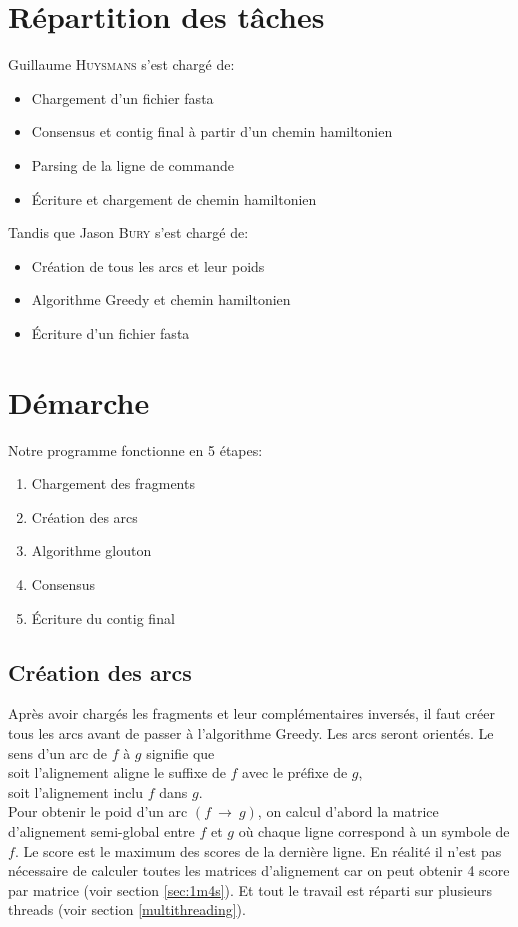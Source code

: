 \documentclass[a4paper, 12pt, titlepage]{article}
\newcommand{\arc}[2]{$(#1~\rightarrow~#2)$}
\begin{document}



\section{Répartition des tâches}
\noindent Guillaume \textsc{Huysmans} s'est chargé de:
\begin{itemize}
 \item Chargement d'un fichier fasta
 \item Consensus et contig final à partir d'un chemin hamiltonien
 \item Parsing de la ligne de commande
 \item Écriture et chargement de chemin hamiltonien
\end{itemize}
\noindent Tandis que Jason \textsc{Bury} s'est chargé de:
\begin{itemize}
 \item Création de tous les arcs et leur poids
 \item Algorithme Greedy et chemin hamiltonien
 \item Écriture d'un fichier fasta
\end{itemize}

\section{Démarche}
Notre programme fonctionne en 5 étapes:
\begin{enumerate}
 \item Chargement des fragments
 \item Création des arcs
 \item Algorithme glouton
 \item Consensus
 \item Écriture du contig final
\end{enumerate}

\subsection{Création des arcs}
Après avoir chargés les fragments et leur complémentaires inversés, il faut créer tous les arcs avant de passer à l'algorithme Greedy.
Les arcs seront orientés. Le sens d'un arc de $f$ à $g$ signifie que\\
soit l'alignement aligne le suffixe de $f$ avec le préfixe de $g$,\\
soit l'alignement inclu $f$ dans $g$.\\
Pour obtenir le poid d'un arc \arc{f}{g},
on calcul d'abord la matrice d'alignement semi-global entre $f$ et $g$ où chaque ligne correspond à un symbole de $f$.
Le score est le maximum des scores de la dernière ligne.
En réalité il n'est pas nécessaire de calculer toutes les matrices d'alignement car on peut obtenir 4 score par matrice (voir section \ref{sec:1m4s}).
Et tout le travail est réparti sur plusieurs threads (voir section \ref{multithreading}).
\end{document}
